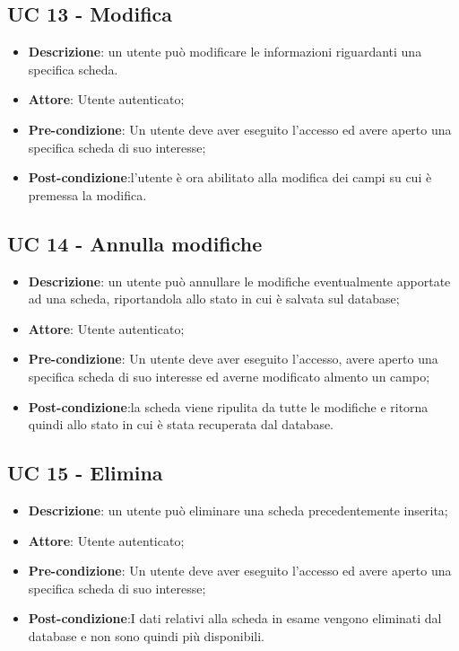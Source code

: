 \subsection{UC 13 - Modifica}

\begin{itemize}
	\item \textbf{Descrizione}: un utente può modificare le informazioni riguardanti una specifica scheda.
	\item \textbf{Attore}: Utente autenticato;
	\item \textbf{Pre-condizione}: Un utente deve aver eseguito l'accesso ed avere aperto una specifica scheda di suo interesse;
	\item \textbf{Post-condizione}:l'utente è ora abilitato alla modifica dei campi su cui è premessa la modifica.
\end{itemize}

\subsection{UC 14 - Annulla modifiche}

\begin{itemize}
	\item \textbf{Descrizione}: un utente può annullare le modifiche eventualmente apportate ad una scheda, riportandola allo stato in cui è salvata sul database;
	\item \textbf{Attore}: Utente autenticato;
	\item \textbf{Pre-condizione}: Un utente deve aver eseguito l'accesso, avere aperto una specifica scheda di suo interesse ed averne modificato almento un campo;
	\item \textbf{Post-condizione}:la scheda viene ripulita da tutte le modifiche e ritorna quindi allo stato in cui è stata recuperata dal database.
\end{itemize}

\subsection{UC 15 - Elimina}

\begin{itemize}
	\item \textbf{Descrizione}: un utente può eliminare una scheda precedentemente inserita;
	\item \textbf{Attore}: Utente autenticato;
	\item \textbf{Pre-condizione}: Un utente deve aver eseguito l'accesso ed avere aperto una specifica scheda di suo interesse;
	\item \textbf{Post-condizione}:I dati relativi alla scheda in esame vengono eliminati dal database e non sono quindi più disponibili.
\end{itemize}

